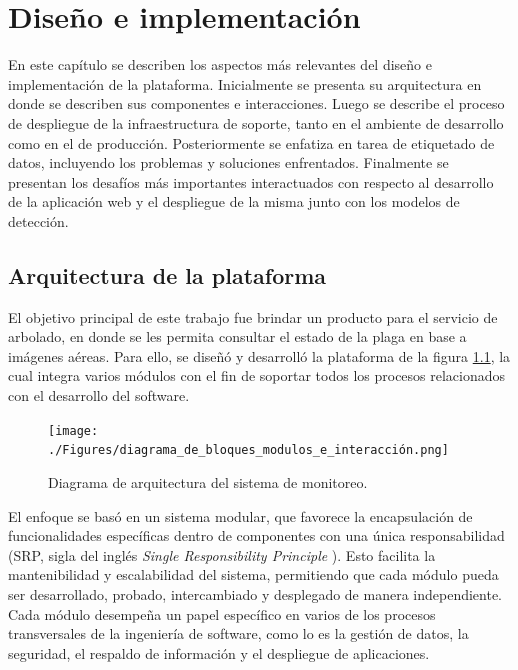 \chapter{Diseño e implementación} %
\label{Chapter3} %

En este capítulo se describen los aspectos más relevantes del diseño e implementación de la plataforma. Inicialmente se presenta su arquitectura en donde se describen sus componentes e interacciones. Luego se describe el proceso de despliegue de la infraestructura de soporte, tanto en el ambiente de desarrollo como en el de producción. Posteriormente se enfatiza en tarea de etiquetado de datos, incluyendo los problemas y soluciones enfrentados. Finalmente se presentan los desafíos más importantes interactuados con respecto al desarrollo de la aplicación web y el despliegue de la misma junto con los modelos de detección.

\section{Arquitectura de la plataforma}
\label{sec:arquitectura}

El objetivo principal de este trabajo fue brindar un producto para el servicio de arbolado, en donde se les permita consultar el estado de la plaga en base a imágenes aéreas. Para ello, se diseñó y desarrolló la plataforma de la figura \ref{fig:plataforma}, la cual integra varios módulos con el fin de soportar todos los procesos relacionados con el desarrollo del software.

\begin{figure}[H]
  \centering
  \texttt{[image: ./Figures/diagrama\_de\_bloques\_modulos\_e\_interacción.png]}
  \caption{Diagrama de arquitectura del sistema de monitoreo.}
  \label{fig:plataforma}
\end{figure}

El enfoque se basó en un sistema modular, que favorece la encapsulación de funcionalidades específicas dentro de componentes con una única responsabilidad (SRP, sigla del inglés \textit{Single Responsibility Principle} \citep{soni_software_2024}). Esto facilita la mantenibilidad y escalabilidad del sistema, permitiendo que cada módulo pueda ser desarrollado, probado, intercambiado y desplegado de manera independiente. Cada módulo desempeña un papel específico en varios de los procesos transversales de la ingeniería de software, como lo es la gestión de datos, la seguridad, el respaldo de información y el despliegue de aplicaciones.

